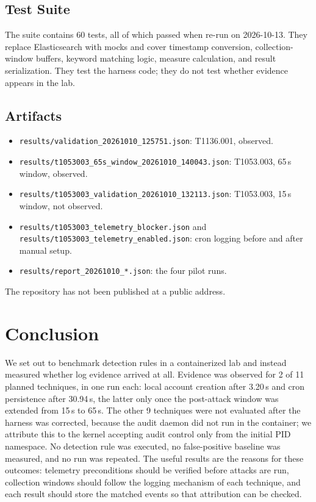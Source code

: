\documentclass[11pt,a4paper]{article}
\begin{document}
\subsection{Test Suite}

The suite contains 60 tests, all of which passed when re-run on 2026-10-13.
They replace Elasticsearch with mocks and cover timestamp conversion,
collection-window buffers, keyword matching logic, measure calculation, and
result serialization. They test the harness code; they do not test whether
evidence appears in the lab.

\subsection{Artifacts}

\begin{itemize}
    \item \texttt{results/validation\_20261010\_125751.json}: T1136.001,
    observed.
    \item \texttt{results/t1053003\_65s\_window\_20261010\_140043.json}:
    T1053.003, 65\,s window, observed.
    \item \texttt{results/t1053003\_validation\_20261010\_132113.json}:
    T1053.003, 15\,s window, not observed.
    \item \texttt{results/t1053003\_telemetry\_blocker.json} and
    \texttt{results/t1053003\_telemetry\_enabled.json}: cron logging before
    and after manual setup.
    \item \texttt{results/report\_20261010\_*.json}: the four pilot runs.
\end{itemize}

The repository has not been published at a public address.

\section{Conclusion}

We set out to benchmark detection rules in a containerized lab and instead
measured whether log evidence arrived at all. Evidence was observed for 2 of
11 planned techniques, in one run each: local account creation after 3.20\,s
and cron persistence after 30.94\,s, the latter only once the post-attack
window was extended from 15\,s to 65\,s. The other 9 techniques were not
evaluated after the harness was corrected, because the audit daemon did not
run in the container; we attribute this to the kernel accepting audit control
only from the initial PID namespace. No detection rule was executed, no
false-positive baseline was
measured, and no run was repeated. The useful results are the reasons for
these outcomes: telemetry preconditions should be verified before attacks are
run, collection windows should follow the logging mechanism of each technique,
and each result should store the matched events so that attribution can be
checked.
\end{document}
